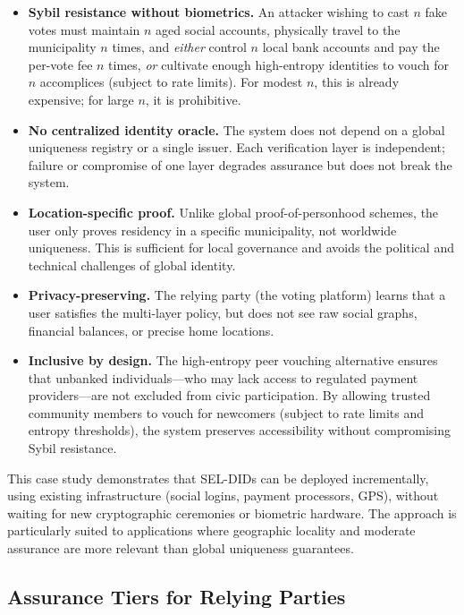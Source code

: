 \documentclass[11pt]{article}
\begin{document}
\begin{itemize}
  \item \textbf{Sybil resistance without biometrics.} An attacker wishing to cast $n$ fake votes must maintain $n$ aged social accounts, physically travel to the municipality $n$ times, and \emph{either} control $n$ local bank accounts and pay the per-vote fee $n$ times, \emph{or} cultivate enough high-entropy identities to vouch for $n$ accomplices (subject to rate limits). For modest $n$, this is already expensive; for large $n$, it is prohibitive.
  \item \textbf{No centralized identity oracle.} The system does not depend on a global uniqueness registry or a single issuer. Each verification layer is independent; failure or compromise of one layer degrades assurance but does not break the system.
  \item \textbf{Location-specific proof.} Unlike global proof-of-personhood schemes, the user only proves residency in a specific municipality, not worldwide uniqueness. This is sufficient for local governance and avoids the political and technical challenges of global identity.
  \item \textbf{Privacy-preserving.} The relying party (the voting platform) learns that a user satisfies the multi-layer policy, but does not see raw social graphs, financial balances, or precise home locations.
  \item \textbf{Inclusive by design.} The high-entropy peer vouching alternative ensures that unbanked individuals---who may lack access to regulated payment providers---are not excluded from civic participation. By allowing trusted community members to vouch for newcomers (subject to rate limits and entropy thresholds), the system preserves accessibility without compromising Sybil resistance.
\end{itemize}

This case study demonstrates that SEL-DIDs can be deployed incrementally, using existing infrastructure (social logins, payment processors, GPS), without waiting for new cryptographic ceremonies or biometric hardware. The approach is particularly suited to applications where geographic locality and moderate assurance are more relevant than global uniqueness guarantees.

\subsection{Assurance Tiers for Relying Parties}
\label{sec:assurance_tiers}
\end{document}
